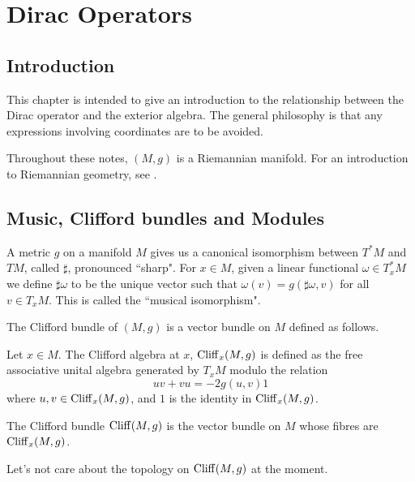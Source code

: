 
\chapter{Dirac Operators} %

\label{Dirac} %




\section{Introduction}
This chapter is intended to give an introduction to the relationship between
the Dirac operator and the exterior algebra. The general philosophy
is that any expressions involving coordinates are to be avoided.

Throughout these notes, $(M,g)$ is a Riemannian manifold. For
an introduction to Riemannian geometry, see \cite{diffGeom}.

\section{Music, Clifford bundles and Modules}
A metric $g$ on a manifold $M$ gives us a canonical isomorphism between $T^*M$
and $TM$, called $\sharp$, pronounced ``sharp". For $x \in M$, given a linear functional
$\omega \in T^*_xM$ we define $\sharp\omega$ to be the unique
vector such that $\omega(v) = g(\sharp\omega,v)$ for all $v \in T_xM$.
This is called the ``musical isomorphism".

The Clifford bundle of $(M,g)$ is a vector bundle on $M$ defined as follows.
\begin{definition}
    Let $x \in M$. The Clifford algebra at $x$, $\operatorname{Cliff}_x(M,g)$ is defined
    as the free associative unital algebra generated by $T_xM$ modulo the relation
    \begin{equation}
        uv+vu = -2g(u,v)1
    \end{equation}
    where $u,v \in \operatorname{Cliff}_x(M,g)$, and $1$ is the identity in $\operatorname{Cliff}_x(M,g)$.
    
    
    The Clifford bundle $\operatorname{Cliff}(M,g)$ is the vector bundle on $M$ whose fibres are 
    $\operatorname{Cliff}_x(M,g)$.
\end{definition}
Let's not care about the topology on $\operatorname{Cliff}(M,g)$ at the moment.

